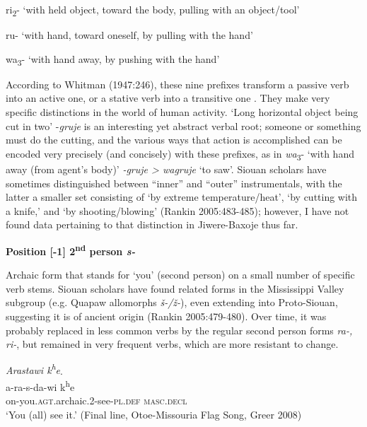 \documentclass[output=paper]{LSP/langsci}
\begin{document}
\hspace{2em} ri\textsubscript{2}-  `with held object, toward the body, pulling with an object/tool'    		

\hspace{2em} ru- `with hand, toward oneself, by pulling with the hand' 			

\hspace{2em} wa\textsubscript{3}- `with hand away, by pushing with the hand'
\vspace{1em}

According to Whitman (1947:246), these nine prefixes transform a passive verb into an active one, or a stative verb into a transitive one \citep[483]{Rankin2005}. They make very specific distinctions in the world of human activity. `Long horizontal object being cut in two' -\textit{gruje} is an interesting yet abstract verbal root; someone or something must do the cutting, and the various ways that action is accomplished can be encoded very precisely (and concisely) with these prefixes, as in \textit{wa}\textsubscript{3}- `with hand away (from agent's body)' \textit{-gruje > wagruje} `to saw'.  Siouan scholars have sometimes distinguished between ``inner'' and ``outer'' instrumentals, with the latter a smaller set consisting of `by extreme temperature/heat', `by cutting with a knife,' and `by shooting/blowing' (Rankin 2005:483-485); however, I have not found data pertaining to that distinction in Jiwere-Baxoje thus far.   		
     
\vspace{1em}
\textbf{Position [-1]  2\textsuperscript{nd} person \textit{s-} }

Archaic form that stands for `you' (second person) on a small number of specific verb stems.  Siouan scholars have found related forms in the Mississippi Valley subgroup (e.g. Quapaw allomorphs \textit{\v{s}-/\v{z}-}), even extending into Proto-Siouan, suggesting it is of ancient origin (Rankin 2005:479-480).  Over time, it was probably replaced in less common verbs by the regular second person forms \textit{ra-, ri-}, but remained in very frequent verbs, which are more resistant to change.        

\begin{exe}
\ex 
\glll \textit{Arastawi k\textsuperscript{h}e}.\\
 a-ra-s-da-wi  k\textsuperscript{h}e  \\
on-you.\textsc{agt}.archaic.2-see-\textsc{pl.def} \textsc{masc.decl} \\
\trans `You (all) see it.'  (Final line, Otoe-Missouria Flag Song, Greer 2008)     
\end{exe}     
					 
\end{document}
